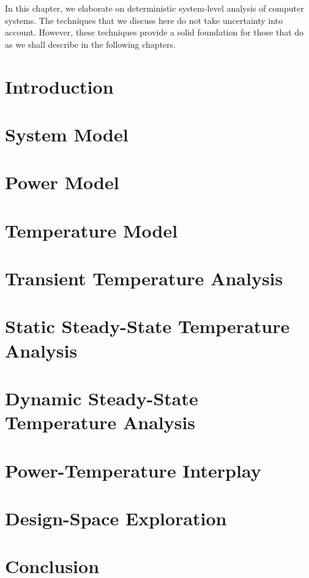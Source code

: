 In this chapter, we elaborate on deterministic system-level analysis of computer
systems. The techniques that we discuss here do not take uncertainty into
account. However, these techniques provide a solid foundation for those that do
as we shall describe in the following chapters.

\section{Introduction}

\section{System Model}

\section{Power Model}

\section{Temperature Model}

\section{Transient Temperature Analysis}

\section{Static Steady-State Temperature Analysis}

\section{Dynamic Steady-State Temperature Analysis}

\section{Power-Temperature Interplay}

\section{Design-Space Exploration}

\section{Conclusion}
